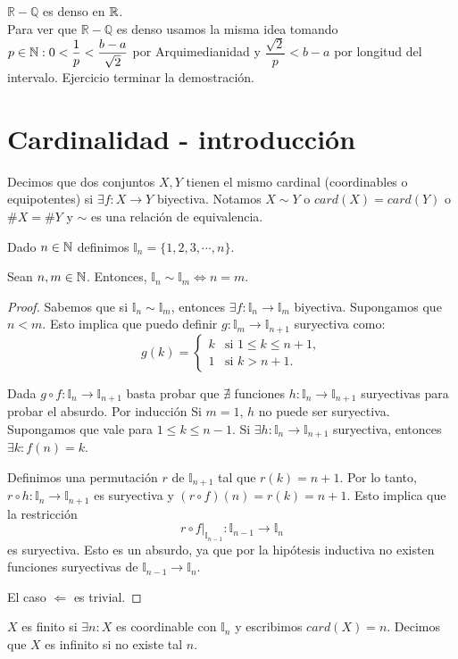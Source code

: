 \begin{eg}
    $\mathbb{R-Q}$ es denso en $\mathbb{R}$. \\
    Para ver que $\mathbb{R-Q}$ es denso usamos la misma idea tomando $p \in \mathbb{N} :0<\dfrac1p<\dfrac{b-a}{\sqrt2}$ por Arquimedianidad y $\dfrac{\sqrt2}{p} < b-a$ por longitud del intervalo.
    Ejercicio terminar la demostración.
\end{eg}

\section{Cardinalidad - introducción}

\begin{definition}
    Decimos que dos conjuntos $X, Y$ tienen el mismo cardinal (coordinables o equipotentes) si $\exists f: X \to Y$ biyectiva. Notamos $X \sim Y$ o $card(X) = card(Y)$ o $\#X=\#Y$ y $\sim$ es una relación de equivalencia.
\end{definition}

\clearpage

Dado $n \in \mathbb{N}$ definimos $\mathbb{I}_n = \{1, 2, 3,\cdots, n\}$.

\begin{theorem}
    Sean $n, m \in \mathbb{N}$. Entonces, $\mathbb{I}_n \sim \mathbb{I}_m \iff n = m$.
    \begin{proof}
        Sabemos que si $\mathbb{I}_n \sim \mathbb{I}_m$, entonces $\exists f: \mathbb{I}_n \to \mathbb{I}_m$ biyectiva. Supongamos que $n < m$. Esto implica que puedo definir $g: \mathbb{I}_m \to \mathbb{I}_{n+1}$ suryectiva como:
        \begin{equation}
            g(k) =
            \begin{cases}
                k & \text{si } 1 \leq k \leq n+1, \\
                1 & \text{si } k > n+1.
            \end{cases}
        \end{equation}

        Dada $g \circ f: \mathbb{I}_n \to \mathbb{I}_{n+1}$ basta probar que $\nexists$ funciones $h: \mathbb{I}_n \to \mathbb{I}_{n+1}$ suryectivas para probar el absurdo. Por inducción
        Si $m = 1$, $h$ no puede ser suryectiva. Supongamos que vale para $1 \leq k \leq n-1$. Si $\exists h: \mathbb{I}_n \to \mathbb{I}_{n+1}$ suryectiva, entonces $\exists k : f(n) = k$.

        Definimos una permutación $r$ de $\mathbb{I}_{n+1}$ tal que $r(k) = n+1$. Por lo tanto, $r \circ h: \mathbb{I}_n \to \mathbb{I}_{n+1}$ es suryectiva y $(r \circ f)(n) = r(k) = n+1$. Esto implica que la restricción
        \[
            r \circ f|_{\mathbb{I}_{n-1}} : \mathbb{I}_{n-1} \to \mathbb{I}_n
        \]
        es suryectiva. Esto es un absurdo, ya que por la hipótesis inductiva no existen funciones suryectivas de $\mathbb{I}_{n-1} \to \mathbb{I}_n$.

        El caso $\Leftarrow$ es trivial.
    \end{proof}
\end{theorem}

\begin{definition}
    $X$ es finito si $\exists n: X$ es coordinable con $\mathbb{I}_n$ y escribimos $card(X)=n$. Decimos que $X$ es infinito si no existe tal $n$.
\end{definition}
